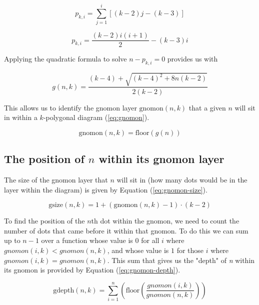 \documentclass[notitlepage]{report}
\begin{document}
\begin{equation}
    p_{k,i} = \sum^{i}_{j=1}\left[(k-2)j-(k-3)\right]
    \label{eq:summation}
\end{equation}

\begin{equation}
    p_{k,i} = \frac{(k-2)i(i+1)}{2} - (k-3)i
    \label{eq:quad}
\end{equation}

Applying the quadratic formula to solve $n-p_{k,i}=0$ provides us with

\begin{equation}
    g\left(n,k\right)=\frac{\left(k-4\right)+\sqrt{\left(k-4\right)^{2}+8n\left(k-2\right)}}{2\left(k-2\right)}
     \label{eq:quadform}
\end{equation}

This allows us to identify the gnomon layer $\text{gnomon}(n,k)$ that a given $n$ will sit in within a $k$-polygonal diagram (\ref{eq:gnomon}).

\begin{equation}
    \text{gnomon}\left(n,k\right) = \text{floor}\left(g\left(n\right)\right)  
    \label{eq:gnomon}
\end{equation}

\subsection*{The position of $n$ within its gnomon layer}

The size of the gnomon layer that $n$ will sit in (how many dots would be in the layer within the diagram) is given by Equation (\ref{eq:gnomon-size}).

\begin{equation}
\text{gsize}\left(n,k\right)= 1+(\text{gnomon}\left(n,k\right)-1)\cdot\left(k-2\right)
\label{eq:gnomon-size}
\end{equation}

To find the position of the $n$th dot within the gnomon, we need to count the number of dots that came before it within that gnomon. To do this we can sum up to $n-1$ over a function whose value is $0$ for all $i$ where $gnomon(i,k)<gnomon(n,k)$, and whose value is $1$ for those $i$ where $gnomon(i,k)=gnomon(n,k)$. This sum that gives us the "depth" of \textit{n} within its gnomon is provided by Equation (\ref{eq:gnomon-depth}).

\begin{equation}
    \text{gdepth}\left(n,k\right)=\sum_{i=1}^{n}\left(\text{floor}\left(\frac{gnomon\left(i,k\right)}{gnomon\left(n,k\right)}\right)\right)
    \label{eq:gnomon-depth}
\end{equation}
\end{document}
